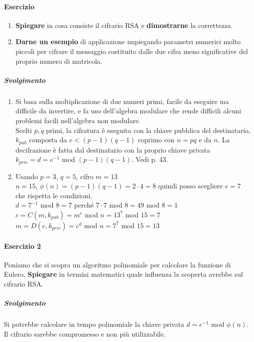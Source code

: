 \documentclass[10pt]{book}
\begin{document}
\paragraph{Esercizio} \begin{enumerate}
	\item \textbf{Spiegare} in cosa consiste il cifrario RSA e \textbf{dimostrarne} la correttezza.
	\item \textbf{Darne un esempio} di applicazione impiegando parametri numerici molto piccoli per cifrare il messaggio costituito dalle due cifra meno significative del proprio numero di matricola.
\end{enumerate}
\subparagraph{Svolgimento} \begin{enumerate}
	\item Si basa sulla moltiplicazione di due numeri primi, facile da eseguire ma difficile da invertire, e fa uso dell'algebra modulare che rende difficili alcuni problemi facili nell'algebra non modulare.\\
	Scelti $p,q$ primi, la cifratura è eseguita con la chiave pubblica del destinatario, $k_{pub}$ composta da $e < (p-1)(q-1)$ coprimo con $n = pq$ e da $n$. La decifrazione è fatta dal destinatario con la proprio chiave privata $k_{priv} = d = e^{-1}$ mod $(p-1)(q-1)$. Vedi p. 43.
	\item Usando $p = 3$, $q = 5$, cifro $m = 13$\\
	$n = 15$, $\phi(n) = (p-1)(q-1) = 2\cdot4 = 8$ quindi posso scegliere $e = 7$ che rispetta le condizioni.\\
	$d = 7^{-1}$ mod $8 = 7$ perché $7\cdot 7$ mod $8 = 49$ mod $8 = 1$\\
	$c = C(m, k_{pub}) = m^e$ mod $n = 13^7$ mod $15 = 7$\\
	$m = D(c, k_{priv}) = c^d$ mod $n = 7^7$ mod $15 = 13$
\end{enumerate}
\paragraph{Esercizio 2} Poniamo che si scopra un algoritmo polinomiale per calcolare la funzione di Eulero. \textbf{Spiegare} in termini matematici quale influenza la scoperta avrebbe sul cifrario RSA.
\subparagraph{Svolgimento} Si potrebbe calcolare in tempo polinomiale la chiave privata $d = e^{-1}$ mod $\phi(n)$. Il cifrario sarebbe compromesso e non più utilizzabile.
\end{document}
